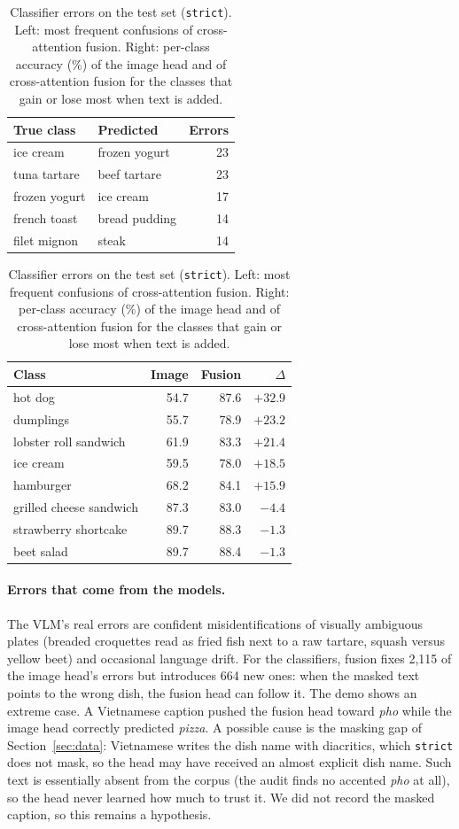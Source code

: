 \documentclass[11pt,a4paper]{article}
\begin{document}
\begin{table}[!htbp]
\centering
\caption{Classifier errors on the test set (\texttt{strict}). Left: most frequent confusions of cross-attention
fusion. Right: per-class accuracy (\%) of the image head and of cross-attention fusion for the classes that gain
or lose most when text is added.}
\label{tab:clferr}
\small
\begin{tabular}{@{}llr@{}}
\toprule
True class & Predicted & Errors \\
\midrule
ice cream & frozen yogurt & 23 \\
tuna tartare & beef tartare & 23 \\
frozen yogurt & ice cream & 17 \\
french toast & bread pudding & 14 \\
filet mignon & steak & 14 \\
\bottomrule
\end{tabular}
\hfill
\begin{tabular}{@{}lrrr@{}}
\toprule
Class & Image & Fusion & $\Delta$ \\
\midrule
hot dog & 54.7 & 87.6 & $+32.9$ \\
dumplings & 55.7 & 78.9 & $+23.2$ \\
lobster roll sandwich & 61.9 & 83.3 & $+21.4$ \\
ice cream & 59.5 & 78.0 & $+18.5$ \\
hamburger & 68.2 & 84.1 & $+15.9$ \\
\midrule
grilled cheese sandwich & 87.3 & 83.0 & $-4.4$ \\
strawberry shortcake & 89.7 & 88.3 & $-1.3$ \\
beet salad & 89.7 & 88.4 & $-1.3$ \\
\bottomrule
\end{tabular}
\end{table}

\paragraph{Errors that come from the models.}
The VLM's real errors are confident misidentifications of visually ambiguous plates (breaded croquettes read as fried
fish next to a raw tartare, squash versus yellow beet) and occasional language drift. For the classifiers, fusion fixes 2,115 of
the image head's errors but introduces 664 new ones: when the masked text points to the wrong dish, the fusion head
can follow it. The demo shows an extreme case. A Vietnamese caption pushed the fusion head toward \emph{pho} while
the image head correctly predicted \emph{pizza}. A possible cause is the masking gap of Section~\ref{sec:data}:
Vietnamese writes the dish name with diacritics, which \texttt{strict} does not mask, so the head may have received
an almost explicit dish name. Such text is essentially absent from the corpus (the audit finds no accented
\emph{pho} at all), so the head never learned how much to trust it. We did not record the masked caption, so this
remains a hypothesis.
\end{document}
